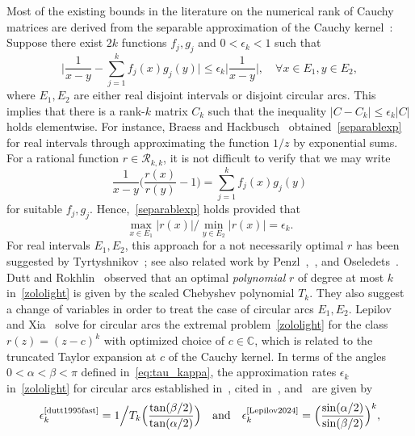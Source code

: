 \documentclass[final,reqno,onefignum,onetabnum]{siamart190516}
\begin{document}
Most of the existing bounds in the literature on the numerical rank of Cauchy matrices are derived from the separable approximation of the Cauchy kernel~\cite{chandrasekaran2007superfast,Penzl2000,Tyrtyshnikov1996}: Suppose there exist $2k$ functions $f_j,g_j$ and $0 < \epsilon_k < 1$ such that
\begin{equation} \label{separablexp}
  \Big| \frac{1}{x-y} - \sum_{j = 1}^k f_j(x) g_j(y)  \Big| \le \epsilon_k \Big| \frac{1}{x-y} \Big|, \quad \forall x \in E_1, y \in E_2,
\end{equation}
where $E_1, E_2$ are either real disjoint intervals or disjoint circular arcs. This implies that there is a rank-$k$ matrix $C_k$ such that 
the inequality $|C-C_k| \le \epsilon_k |C|$ holds elementwise. For instance, Braess and Hackbusch~\cite{braess2009efficient} obtained~\eqref{separablexp} for real intervals through approximating the function $1/z$ by exponential sums. For a rational function $r\in \mathcal{R}_{k,k}$, it is not difficult
to verify that we may write
\[
 \frac{1}{x-y} \Big( \frac{r(x)}{r(y)}-1 \Big) = \sum_{j = 1}^k f_j(x) g_j(y)
\]
for suitable $f_j,g_j$. Hence,~\eqref{separablexp} holds provided that
\begin{equation} \label{zololight}
 \max_{x \in E_1} |r(x)| \big/ \min_{y \in E_2} |r(x)| = \epsilon_k.
\end{equation}
For real intervals $E_1,E_2$, this approach for a not necessarily optimal $r$ has been suggested by Tyrtyshnikov~\cite{Tyrtyshnikov1996}; see also related work by Penzl~\cite{Penzl2000},~\cite{Grasedyck2004}, and Oseledets~\cite{Oseledets2007}.
Dutt and Rokhlin~\cite[Sec. 2.2]{dutt1995fast} observed that an optimal \emph{polynomial} $r$ of degree at most $k$ in~\eqref{zololight} is given by the scaled Chebyshev polynomial $T_k$. They also suggest a change of variables in order to treat the case of circular arcs $E_1,E_2$. Lepilov and Xia~\cite[Theorem 1]{Lepilov2024} solve for circular arcs the extremal problem~\eqref{zololight} for the class $r(z) = (z-c)^k$ with optimized choice of $c \in \mathbb C$, which is related to the truncated Taylor expansion at $c$ of the Cauchy kernel. In terms of the angles $0 < \alpha < \beta < \pi$ defined in~\eqref{eq:tau_kappa}, the approximation rates $\epsilon_k$ in~\eqref{zololight} for circular arcs established in~\cite{dutt1995fast}, cited in~\cite{martinsson2005fast},
and~\cite{Lepilov2024} are given by
\[
 \epsilon^{\text{\cite{dutt1995fast}}}_k = 1 \Big/ T_k\Big( \frac{\tan(\beta/2)}{\tan(\alpha/2)} \Big) \quad \text{and} \quad 
 \epsilon^{\text{\cite{Lepilov2024}}}_k = \Big(\frac{\sin(\alpha/2)}{\sin(\beta/2)}  \Big)^k,
\]
\end{document}
